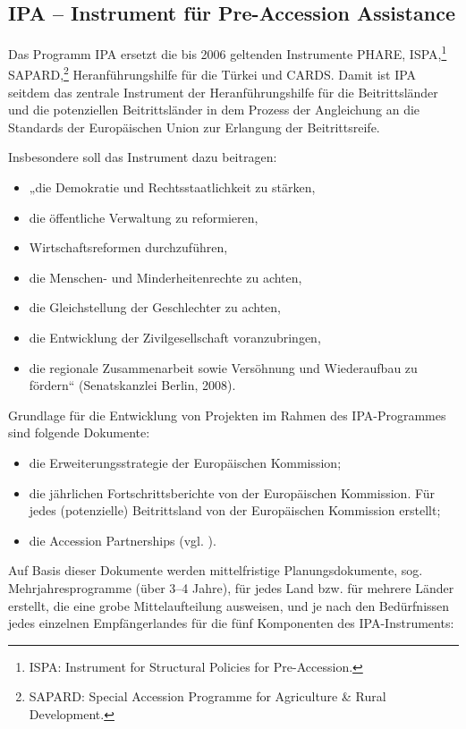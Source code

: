 \subsection{IPA – Instrument für Pre-Accession Assistance}
Das Programm IPA ersetzt die bis 2006 geltenden Instrumente PHARE, ISPA,\footnote{ISPA: Instrument for Structural Policies for Pre-Accession.} SAPARD,\footnote{SAPARD: Special Accession Programme for Agriculture \& Rural Development.} Heranführungshilfe für die Türkei und CARDS. Damit ist IPA seitdem das zentrale Instrument der Heranführungshilfe für die Beitrittsländer und die potenziellen Beitrittsländer in dem Prozess der Angleichung an die Standards der Europäischen Union zur Erlangung der Beitrittsreife.\par

Insbesondere soll das Instrument dazu beitragen:
\begin{itemize} \itemsep1pt \parskip0pt 
\item „die Demokratie und Rechtsstaatlichkeit zu stärken,
\item die öffentliche Verwaltung zu reformieren,
\item Wirtschaftsreformen durchzuführen,
\item die Menschen- und Minderheitenrechte zu achten,
\item die Gleichstellung der Geschlechter zu achten,
\item die Entwicklung der Zivilgesellschaft voranzubringen,
\item die regionale Zusammenarbeit sowie Versöhnung und Wiederaufbau zu fördern“ (Senatskanzlei Berlin, 2008). 
\end{itemize}
Grundlage für die Entwicklung von Projekten im Rahmen des IPA-Programmes sind folgende Dokumente:
\begin{itemize} \itemsep1pt \parskip0pt 
\item die Erweiterungsstrategie der Europäischen Kommission;
\item die jährlichen Fortschrittsberichte von der Europäischen Kommission. Für jedes (potenzielle) Beitrittsland von der Europäischen Kommission erstellt;
\item die Accession Partnerships (vgl. \cite{eurcom11a}).
\end{itemize}
Auf Basis dieser Dokumente werden mittelfristige Planungsdokumente, sog. Mehrjahresprogramme (über 3–4 Jahre), für jedes Land bzw. für mehrere Länder erstellt, die eine grobe Mittelaufteilung ausweisen, und je nach den Bedürfnissen jedes einzelnen Empfängerlandes für die fünf Komponenten des IPA-Instruments:
